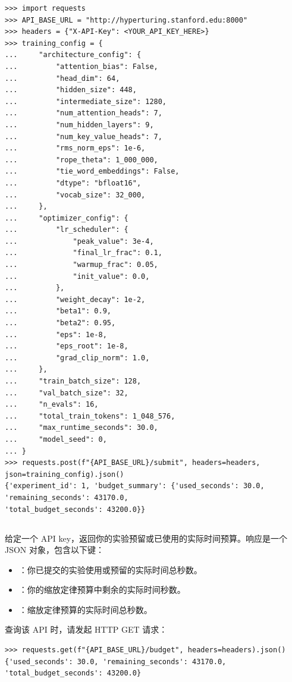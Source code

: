 \begin{lstlisting}
>>> import requests
>>> API_BASE_URL = "http://hyperturing.stanford.edu:8000"
>>> headers = {"X-API-Key": <YOUR_API_KEY_HERE>}
>>> training_config = {
...     "architecture_config": {
...         "attention_bias": False,
...         "head_dim": 64,
...         "hidden_size": 448,
...         "intermediate_size": 1280,
...         "num_attention_heads": 7,
...         "num_hidden_layers": 9,
...         "num_key_value_heads": 7,
...         "rms_norm_eps": 1e-6,
...         "rope_theta": 1_000_000,
...         "tie_word_embeddings": False,
...         "dtype": "bfloat16",
...         "vocab_size": 32_000,
...     },
...     "optimizer_config": {
...         "lr_scheduler": {
...             "peak_value": 3e-4,
...             "final_lr_frac": 0.1,
...             "warmup_frac": 0.05,
...             "init_value": 0.0,
...         },
...         "weight_decay": 1e-2,
...         "beta1": 0.9,
...         "beta2": 0.95,
...         "eps": 1e-8,
...         "eps_root": 1e-8,
...         "grad_clip_norm": 1.0,
...     },
...     "train_batch_size": 128,
...     "val_batch_size": 32,
...     "n_evals": 16,
...     "total_train_tokens": 1_048_576,
...     "max_runtime_seconds": 30.0,
...     "model_seed": 0,
... }
>>> requests.post(f"{API_BASE_URL}/submit", headers=headers, json=training_config).json()
{'experiment_id': 1, 'budget_summary': {'used_seconds': 30.0, 'remaining_seconds': 43170.0,
'total_budget_seconds': 43200.0}}
\end{lstlisting}

\subsection*{}

给定一个 API key，返回你的实验预留或已使用的实际时间预算。响应是一个 JSON 对象，包含以下键：

\begin{itemize}
  \item {}：你已提交的实验使用或预留的实际时间总秒数。
  \item {}：你的缩放定律预算中剩余的实际时间秒数。
  \item {}：缩放定律预算的实际时间总秒数。
\end{itemize}

查询该 API 时，请发起 HTTP GET 请求：

\begin{lstlisting}
>>> requests.get(f"{API_BASE_URL}/budget", headers=headers).json()
{'used_seconds': 30.0, 'remaining_seconds': 43170.0, 'total_budget_seconds': 43200.0}
\end{lstlisting}

